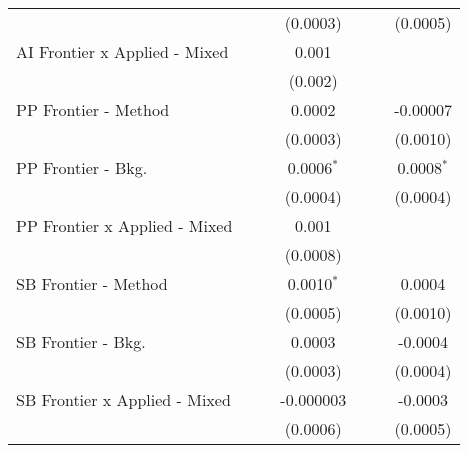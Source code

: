 \begin{tabular}{lcccccc}
                                  &                 &                & (0.0003)       &                 &                & (0.0005)\\   
   AI Frontier x Applied - Mixed  &                 &                & 0.001          &                 &                &   \\   
                                  &                 &                & (0.002)        &                 &                &   \\   
   PP Frontier - Method           &                 &                & 0.0002         &                 &                & -0.00007\\   
                                  &                 &                & (0.0003)       &                 &                & (0.0010)\\   
   PP Frontier - Bkg.             &                 &                & 0.0006$^{*}$   &                 &                & 0.0008$^{*}$\\   
                                  &                 &                & (0.0004)       &                 &                & (0.0004)\\   
   PP Frontier x Applied - Mixed  &                 &                & 0.001          &                 &                &   \\   
                                  &                 &                & (0.0008)       &                 &                &   \\   
   SB Frontier - Method           &                 &                & 0.0010$^{*}$   &                 &                & 0.0004\\   
                                  &                 &                & (0.0005)       &                 &                & (0.0010)\\   
   SB Frontier - Bkg.             &                 &                & 0.0003         &                 &                & -0.0004\\   
                                  &                 &                & (0.0003)       &                 &                & (0.0004)\\   
   SB Frontier x Applied - Mixed  &                 &                & -0.000003      &                 &                & -0.0003\\   
                                  &                 &                & (0.0006)       &                 &                & (0.0005)\\   

\end{tabular}
